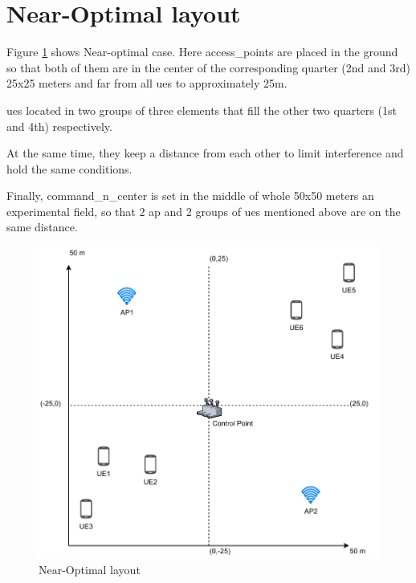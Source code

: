 \section{Near-Optimal layout}\label{near-optimal-layout}

Figure \ref{fig:near-optimal-layout} shows Near-optimal case. Here \glspl{access_point} are placed in the ground
so that both of them are in the center of the corresponding quarter (2nd and 3rd) 25x25 meters and far from all \glspl{ue} to approximately 25m.

\glspl{ue} located in two groups of three elements that fill the other two
quarters (1st and 4th) respectively.

At the same time, they keep a distance from each other to limit interference and hold the same conditions.

Finally, \gls{command_n_center} is set in the middle of whole 50x50 meters an
experimental field, so that 2 \gls{ap} and 2 groups of \glspl{ue} mentioned above are on the same distance.

\begin{figure}[H]
	\centering
	\includegraphics[width=0.7\linewidth,keepaspectratio]{images/05-cases-description-Near-Optimal.pdf}
	\caption{Near-Optimal layout}
	\label{fig:near-optimal-layout}
\end{figure}
